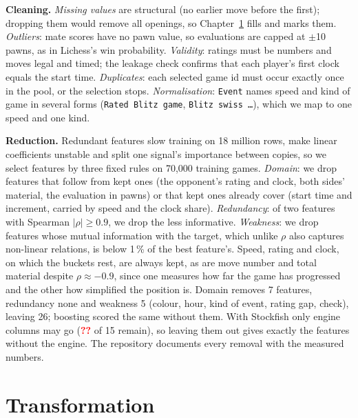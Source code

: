 \documentclass[a4paper,oneside,bibliography=totoc]{scrbook}
\newcommand{\tbd}{\textcolor{red}{\textbf{??}}}
\newcommand{\stale}[1]{\textcolor{BurntOrange}{#1}}
\begin{document}
\textbf{Cleaning.} \emph{Missing values} are structural (no earlier move before the first); dropping them would
remove all openings, so Chapter~\ref{ch:transformation} fills and marks them. \emph{Outliers}: mate scores have
no pawn value, so evaluations are capped at $\pm$10 pawns, as in Lichess's win probability. \emph{Validity}:
ratings must be numbers and moves legal and timed; the leakage check confirms that each player's first clock
equals the start time.
\emph{Duplicates}: each selected game id must occur exactly once in the pool, or the selection stops.
\emph{Normalisation}: \texttt{Event} names speed and kind of game in several forms (\texttt{Rated Blitz game},
\texttt{Blitz swiss \dots}), which we map to one speed and one kind.

\textbf{Reduction.} Redundant features slow training on 18 million rows, make linear coefficients unstable and split one
signal's importance between copies, so we select features by three fixed rules on 70,000 training games.
\emph{Domain}: we drop features that follow from kept ones (the opponent's rating and clock, both sides'
material, the evaluation in pawns) or that kept ones already cover (start time and increment, carried by
speed and the clock share). \emph{Redundancy}: of two features with Spearman $|\rho| \ge 0.9$, we drop the
less informative. \emph{Weakness}: we drop features whose mutual information with the target, which unlike
$\rho$ also captures non-linear relations, is below 1\,\% of the best feature's. Speed, rating and clock,
on which the buckets rest, are always kept, as are move number and total material despite $\rho \approx
-0.9$, since one measures how far the game has progressed and the other how simplified the position is.
Domain removes \stale{7} features, redundancy none and weakness \stale{5} (colour, hour, kind of event,
rating gap, check), leaving \stale{26}; boosting scored the same without them. With Stockfish only
engine columns may go (\tbd{} of 15 remain), so leaving them out gives exactly the features without the engine. The repository
documents every removal with the measured numbers.

\chapter{Transformation}
\label{ch:transformation}
\end{document}
